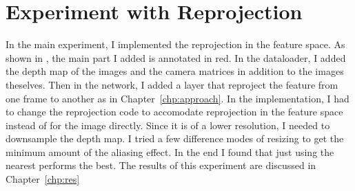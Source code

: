 \section{Experiment with Reprojection}
In the main experiment, I implemented the reprojection in the feature space. As shown in , the main part I added is annotated in red. In the dataloader, I added the depth map of the images and the camera matrices in addition to the images theselves. Then in the network, I added a layer that reproject the feature from one frame to another as in Chapter~\ref{chp:approach}. In the implementation, I had to change the reprojection code to accomodate reprojection in the feature space instead of for the image directly. Since it is of a lower resolution, I needed to downsample the depth map. I tried a few difference modes of resizing to get the minimum amount of the aliasing effect. In the end I found that just using the nearest performs the best. The results of this experiment are discussed in Chapter~\ref{chp:res}

